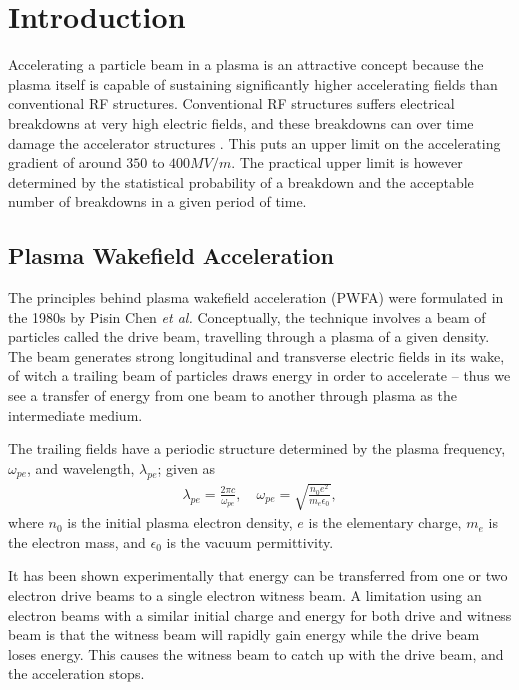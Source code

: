 %
%

\chapter{Introduction}
\label{Ch:Intro}

Accelerating a particle beam in a plasma is an attractive concept because the plasma itself is capable of sustaining
significantly higher accelerating fields than conventional RF structures. Conventional RF structures suffers electrical
breakdowns at very high electric fields, and these breakdowns can over time damage the accelerator structures
\cite{braun:2003}. This puts an upper limit on the accelerating gradient of around $350$ to $400\unit{MV/m}$. The
practical upper limit is however determined by the statistical probability of a breakdown and the acceptable number
of breakdowns in a given period of time.\cite{pritzkau:2002}

\section{Plasma Wakefield Acceleration}
\label{Int:PWFA}

The principles behind plasma wakefield acceleration (PWFA) were formulated in the 1980s by Pisin Chen \emph{et al.}
\cite{chen:1985} Conceptually, the technique involves a beam of particles called the drive beam, travelling through
a plasma of a given density. The beam generates strong longitudinal and transverse electric fields in its wake, of witch
a trailing beam of particles draws energy in order to accelerate -- thus we see a transfer of energy from one beam to
another through plasma as the intermediate medium.

The trailing fields have a periodic structure determined by the plasma frequency, $\omega_{pe}$, and wavelength,
$\lambda_{pe}$; given as
\begin{align}
    \lambda_{pe} = \frac{2\pi c}{\omega_{pe}}, \quad
    \omega_{pe}  = \sqrt{\frac{n_{0}e^{2}}{m_{e}\epsilon_{0}}}, \label{EQ:PWFA:L0W0}
\end{align}
where $n_{0}$ is the initial plasma electron density, $e$ is the elementary charge, $m_{e}$ is the electron mass, and
$\epsilon_{0}$ is the vacuum permittivity.

It has been shown experimentally that energy can be transferred from one or two electron drive beams to a single
electron witness beam.\cite{rosenzweig:1988, blumenfeld:2007, kallos:2008} A limitation using an electron beams with a
similar initial charge and energy for both drive and witness beam is that the witness beam will rapidly gain energy
while the drive beam loses energy. This causes the witness beam to catch up with the drive beam, and the acceleration
stops.

